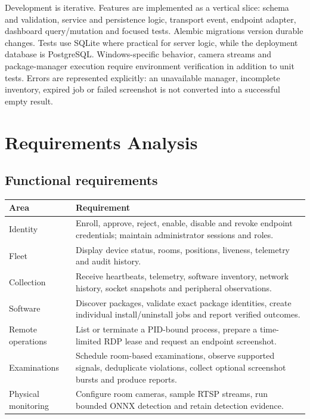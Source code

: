 \documentclass[12pt,a4paper]{report}
\begin{document}
Development is iterative. Features are implemented as a vertical slice:
schema and validation, service and persistence logic, transport event,
endpoint adapter, dashboard query/mutation and focused tests. Alembic
migrations version durable changes. Tests use SQLite where practical for
server logic, while the deployment database is PostgreSQL. Windows-specific
behavior, camera streams and package-manager execution require environment
verification in addition to unit tests. Errors are represented explicitly:
an unavailable manager, incomplete inventory, expired job or failed screenshot
is not converted into a successful empty result.

\section{Requirements Analysis}

\subsection{Functional requirements}
\begin{longtable}{p{}p{}}
\toprule
\textbf{Area} & \textbf{Requirement}\\
\midrule
Identity & Enroll, approve, reject, enable, disable and revoke endpoint
credentials; maintain administrator sessions and roles.\\
Fleet & Display device status, rooms, positions, liveness, telemetry and
audit history.\\
Collection & Receive heartbeats, telemetry, software inventory, network
history, socket snapshots and peripheral observations.\\
Software & Discover packages, validate exact package identities, create
individual install/uninstall jobs and report verified outcomes.\\
Remote operations & List or terminate a PID-bound process, prepare a
time-limited RDP lease and request an endpoint screenshot.\\
Examinations & Schedule room-based examinations, observe supported signals,
deduplicate violations, collect optional screenshot bursts and produce reports.\\
Physical monitoring & Configure room cameras, sample RTSP streams, run
bounded ONNX detection and retain detection evidence.\\
\bottomrule
\end{longtable}
\end{document}
